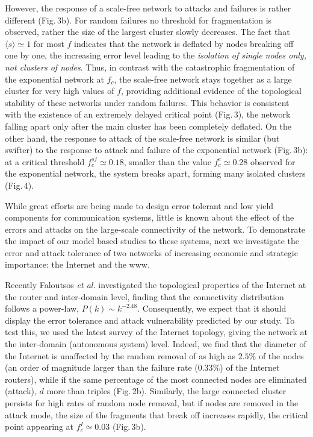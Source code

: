 However, the response of a scale-free network to attacks and failures is rather different (Fig.$\,$3b). For random failures no threshold for fragmentation is observed, rather the size of the largest cluster slowly decreases. The fact that $\langle s\rangle\simeq 1$ for most $f$ indicates that the network is deflated by nodes breaking off one by one, the increasing error level leading to the {\it isolation of single nodes only, not clusters of nodes}. Thus, in contrast with the catastrophic fragmentation of the exponential network at $f_c$, the scale-free network stays together as a large cluster for very high values of $f$, providing additional evidence of the topological stability of these networks under random failures. This behavior is consistent with the existence of an extremely delayed critical point (Fig.$\,$3), the network falling apart
only after the main cluster has been completely deflated. On the other hand, the response to attack of the scale-free network is similar (but swifter) to the response to attack and failure of the exponential network (Fig.$\,$3b): at a critical threshold $f_c^{sf}\simeq 0.18$, smaller than the value $f_c^e\simeq 0.28$ observed for the exponential network, the system breaks apart, forming many isolated clusters (Fig.$\,$4). 

While great efforts are being made to design error tolerant and low yield components for communication systems, little is known about the effect of the errors and attacks on the large-scale connectivity of the network. To demonstrate the impact of our model based studies to these systems, next we investigate the error and attack tolerance of two networks of increasing economic and strategic importance: the Internet and the www.

  Recently Faloutsos {\it et al.}\cite{faloutsos} investigated the topological properties of the Internet at the router and inter-domain level, finding that the connectivity distribution follows a power-law, $P(k)\sim k^{-2.48}$. Consequently, we expect that it should display the error tolerance and attack vulnerability predicted by our study. To test this, we used  the latest survey of the Internet  topology, giving the network at the inter-domain (autonomous system) level. Indeed, we find that the diameter of the Internet is unaffected by the random removal of as high as $2.5\%$ of the nodes (an order of magnitude larger than the failure rate ($0.33\%$) of the Internet routers\cite{labovitz}), while if the same percentage of the most connected nodes are eliminated (attack), $d$ more than triples (Fig.$\,$2b). Similarly, the large connected cluster persists for high rates of random node removal, but if nodes are removed in the attack mode, the size of the fragments that break off increases rapidly, the critical point appearing at $f_c^I\simeq 0.03$ (Fig.$\,$3b). 

